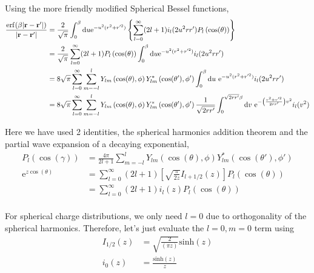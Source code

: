 \documentclass[paper=a4, fontsize=11pt]{article} %
\numberwithin{equation}{section} %
\numberwithin{figure}{section} %
\numberwithin{table}{section} %
\newcommand{\br}{{\bf{r}}}
\newcommand{\re}{{\mathrm{e}}}
\newcommand{\rerf}{{\mathrm{erf}}}
\newcommand{\rd}{{\mathrm{d}}}
\begin{document}
Using the more friendly modified Spherical Bessel functions,
\begin{equation}
\begin{split}
\frac{\rerf(\beta|\br-\br'|)}{|\br-\br'|}
&= \frac{2}{\sqrt{\pi}}\int_0^\beta \rd u \re^{-u^2(r^2 + r'^2)} \left\{\sum_{l=0}^\infty (2l+1) i_{l}(2u^2 r r')P_l\left(\cos(\theta)\right)\right\} \\
&= \frac{2}{\sqrt{\pi}}\sum_{l=0}^\infty (2l+1)P_l\left(\cos(\theta)\right) \int_0^\beta \rd u \re^{-u^2(r^2 + r'^2)}i_{l}(2u^2 r r') \\
&= 8\sqrt{\pi}\sum_{l=0}^\infty \sum_{m=-l}^{l} Y_{lm}\left(\cos(\theta),\phi\right)Y_{lm}^*\left(\cos(\theta'),\phi'\right) \int_0^\beta \rd u\ \re^{-u^2(r^2 + r'^2)}i_{l}(2u^2 r r') \\
&= 8\sqrt{\pi}\sum_{l=0}^\infty \sum_{m=-l}^{l} Y_{lm}\left(\cos(\theta),\phi\right)Y_{lm}^*\left(\cos(\theta'),\phi'\right) \frac{1}{\sqrt{2rr'}} \int_0^{\sqrt{2rr'}\beta} \rd v\ \re^{-\left(\frac{r^2 + r'^2}{2rr'}\right)v^2}i_{l}(v^2) \\
\end{split}
\end{equation}

Here we have used 2 identities, the spherical harmonics addition theorem and the partial wave expansion of a decaying exponential,
\begin{equation}
\begin{split}
P_l(\cos(\gamma)) &= \frac{4\pi}{2l + 1} \sum_{m=-l}^{l} Y_{lm}\left(\cos(\theta),\phi\right)Y_{lm}^*\left(\cos(\theta'),\phi'\right) \\
\re^{z \cos(\theta)} &= \sum_{l=0}^\infty (2l+1)\left[\sqrt{\frac{\pi}{2z}}I_{l+1/2}(z)\right]P_l(\cos(\theta)) \\
&= \sum_{l=0}^\infty (2l+1) i_{l}(z) P_l(\cos(\theta)) \\
\end{split}
\end{equation}


For spherical charge distributions, we only need $l=0$ due to orthogonality of the spherical harmonics. Therefore, let's just evaluate the $l=0, m=0$ term using 
\begin{equation}
\begin{split}
I_{1/2}(z) &= \sqrt{\frac{2}{(\pi z)}} \mathrm{sinh}(z)\\
i_0(z) &= \frac{\mathrm{sinh}(z)}{z}
\end{split}
\end{equation}
\end{document}
